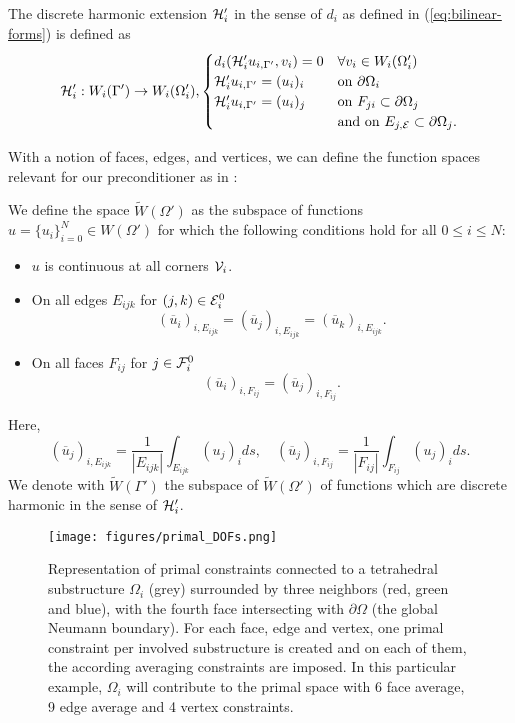 \begin{definition}
    The discrete harmonic extension $\mathcal{H}_i'$ in the sense of $d_i$ as defined in (\ref{eq:bilinear-forms}) is defined as
    \begin{equation*}
    \mathcal{H}_i': W_i(\Gamma') \rightarrow W_i(\Omega_i'), 
    \begin{cases}
        d_i(\mathcal{H}_i'u_{i,\Gamma'}, v_i) = 0 & \forall v_i \in W_i(\Omega_i') \\
        \mathcal{H}_i'u_{i,\Gamma'} = (u_i)_i & \text{on } \partial \Omega_i \\
        \mathcal{H}_i'u_{i,\Gamma'} = (u_i)_j & \text{on } F_{ji} \subset \partial \Omega_j \\
        & \text{and on } E_{j, \mathcal{E}} \subset \partial \Omega_j.
    \end{cases}
    \end{equation*}
\end{definition}

With a notion of faces, edges, and vertices, we can define the function spaces relevant for our preconditioner as in \cite{dd-book, sarkis-3D}:

\begin{definition}
\label{sec2:VEF}
We define the space $\widetilde{W}(\Omega')$ as the subspace of functions $u = \{u_i\}_{i=0}^N \in W(\Omega')$ for which the following conditions hold for all $0 \leq i \leq N$:
\begin{itemize}
    \item $u$ is continuous at all corners $\mathcal{V}_i$.
    \item On all edges $E_{ijk}$ for $(j,k) \in \mathcal{E}_i^0$
    \[(\overline{u}_i)_{i,E_{ijk}} = (\overline{u}_j)_{i,E_{ijk}} = (\overline{u}_k)_{i, E_{ijk}}.\]
    \item On all faces $F_{ij}$ for $j \in \mathcal{F}_i^0$
    \[(\overline{u}_i)_{i,F_{ij}} = (\overline{u}_j)_{i,F_{ij}}.\]
\end{itemize}

Here, 
\[(\overline{u}_j)_{i,E_{ijk}} = \frac{1}{|E_{ijk}|} \int_{E_{ijk}}(u_j)_i ds, \quad (\overline{u}_j)_{i,F_{ij}} = \frac{1}{|F_{ij}|} \int_{F_{ij}}(u_j)_i ds.\]
We denote with $\widetilde{W}(\Gamma')$ the subspace of $\widetilde{W}(\Omega')$ of functions which are discrete harmonic in the sense of $\mathcal{H}_i'$.
\end{definition}

\begin{figure}
    \centering
    \texttt{[image: figures/primal\_DOFs.png]}
    \caption{Representation of primal constraints connected to a tetrahedral substructure $\Omega_i$ (grey) surrounded by three neighbors (red, green and blue), with the fourth face intersecting with $\partial \Omega$ (the global Neumann boundary). For each face, edge and vertex, one primal constraint per involved substructure is created and on each of them, the according averaging constraints are imposed. In this particular example, $\Omega_i$ will contribute to the primal space with 6 face average, 9 edge average and 4 vertex constraints.}
    \label{fig:primal-constraints}
\end{figure}


